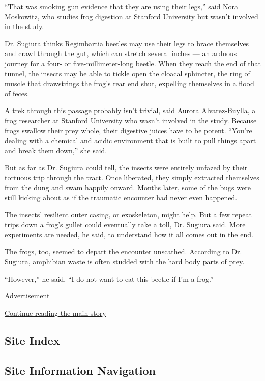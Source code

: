 ``That was smoking gun evidence that they are using their legs,'' said
Nora Moskowitz, who studies frog digestion at Stanford University but
wasn't involved in the study.

Dr. Sugiura thinks Regimbartia beetles may use their legs to brace
themselves and crawl through the gut, which can stretch several inches
--- an arduous journey for a four- or five-millimeter-long beetle. When
they reach the end of that tunnel, the insects may be able to tickle
open the cloacal sphincter, the ring of muscle that drawstrings the
frog's rear end shut, expelling themselves in a flood of feces.

A trek through this passage probably isn't trivial, said Aurora
Alvarez-Buylla, a frog researcher at Stanford University who wasn't
involved in the study. Because frogs swallow their prey whole, their
digestive juices have to be potent. ``You're dealing with a chemical and
acidic environment that is built to pull things apart and break them
down,'' she said.

But as far as Dr. Sugiura could tell, the insects were entirely unfazed
by their tortuous trip through the tract. Once liberated, they simply
extracted themselves from the dung and swam happily onward. Months
later, some of the bugs were still kicking about as if the traumatic
encounter had never even happened.

The insects' resilient outer casing, or exoskeleton, might help. But a
few repeat trips down a frog's gullet could eventually take a toll, Dr.
Sugiura said. More experiments are needed, he said, to understand how it
all comes out in the end.

The frogs, too, seemed to depart the encounter unscathed. According to
Dr. Sugiura, amphibian waste is often studded with the hard body parts
of prey.

``However,'' he said, ``I do not want to eat this beetle if I'm a
frog.''

Advertisement

\protect\hyperlink{after-bottom}{Continue reading the main story}

\hypertarget{site-index}{%
\subsection{Site Index}\label{site-index}}

\hypertarget{site-information-navigation}{%
\subsection{Site Information
Navigation}\label{site-information-navigation}}

